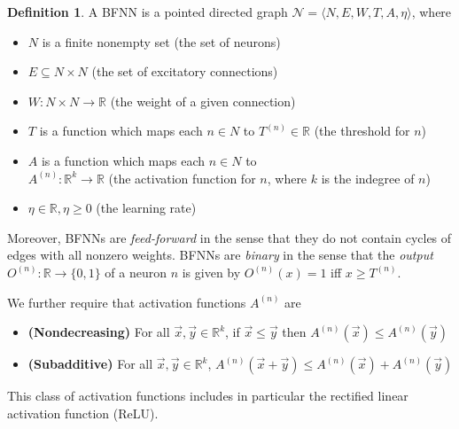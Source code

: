 \documentclass[12pt]{article}
\theoremstyle{definition}
\newtheorem{definition}{Definition}
\newcommand{\set}[1]{\{ #1 \}}
\newcommand{\Net}{\mathcal{N}}
\begin{document}
\begin{definition} A BFNN is a pointed directed graph ${\Net = \langle N, E, W, T, A, \eta \rangle}$, where
\begin{itemize}
    \item $N$ is a finite nonempty set (the set of neurons)
    \item $E \subseteq N \times N$ (the set of excitatory connections)
    \item $W : N \times N \to \mathbb{R}$ (the weight of a given connection)
    \item $T$ is a function which maps each $n \in N$ to 
    $T^{(n)} \in \mathbb{R}$ (the threshold for $n$)
    
    
    \item $A$ is a function which maps each $n \in N$ to\\
    $A^{(n)} : \mathbb{R}^k \to \mathbb{R}$ (the activation function for $n$, where $k$ is the indegree of $n$)
    \item $\eta \in \mathbb{R}, \eta \geq 0$ (the learning rate)
\end{itemize}
Moreover, BFNNs are \emph{feed-forward} in the sense that they do not contain cycles of edges with all nonzero weights.  BFNNs are \emph{binary} in the sense that the \emph{output} $O^{(n)} : \mathbb{R} \to \set{0, 1}$ of a neuron $n$ is given by $O^{(n)}(x) = 1$ iff $x \geq T^{(n)}$.

We further require that activation functions $A^{(n)}$ are
\begin{itemize}
    \item \textbf{(Nondecreasing)} For all $\vec{x}, \vec{y} \in \mathbb{R}^k$,
    if $\vec{x} \leq \vec{y}$ then $A^{(n)}(\vec{x}) \leq A^{(n)}(\vec{y})$
    
    \item \textbf{(Subadditive)} For all $\vec{x}, \vec{y} \in \mathbb{R}^k$,
    $A^{(n)}(\vec{x} + \vec{y}) \leq A^{(n)}(\vec{x}) + A^{(n)}(\vec{y})$
\end{itemize}
\end{definition}

This class of activation functions includes in particular the rectified linear activation function (ReLU).
\end{document}
